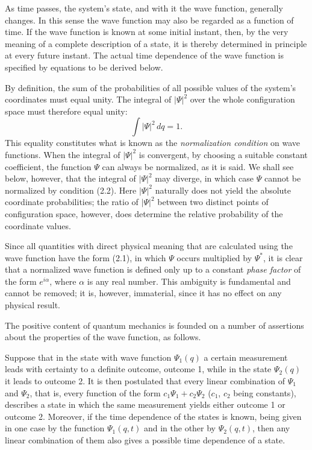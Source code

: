 As time passes, the system's state, and with it the wave function, generally
changes. In this sense the wave function may also be regarded as a function of
time. If the wave function is known at some initial instant, then, by the very
meaning of a complete description of a state, it is thereby determined in
principle at every future instant. The actual time dependence of the wave
function is specified by equations to be derived below.

By definition, the sum of the probabilities of all possible values of the
system's coordinates must equal unity. The integral of $|\Psi|^2$ over the
whole configuration space must therefore equal unity:
\begin{equation}
  \int |\Psi|^2\,dq=1.
  \tag{2.2}
\end{equation}
This equality constitutes what is known as the \textit{normalization condition}
on wave functions. When the integral of $|\Psi|^2$ is convergent, by choosing a
suitable constant coefficient, the function $\Psi$ can always be normalized,
as it is said. We shall see below, however, that the integral of $|\Psi|^2$
may diverge, in which case $\Psi$ cannot be normalized by condition (2.2).
Here $|\Psi|^2$ naturally does not yield the absolute coordinate
probabilities; the ratio of $|\Psi|^2$ between two distinct points of
configuration space, however, does determine the relative probability of
the coordinate values.

Since all quantities with direct physical meaning that are calculated using
the wave function have the form (2.1), in which $\Psi$ occurs multiplied by
$\Psi^*$, it is clear that a normalized wave function is defined only up to a
constant \textit{phase factor} of the form $e^{i\alpha}$, where $\alpha$ is
any real number. This ambiguity is fundamental and cannot be removed; it is,
however, immaterial, since it has no effect on any physical result.

The positive content of quantum mechanics is founded on a number of assertions
about the properties of the wave function, as follows.

Suppose that in the state with wave function $\Psi_1(q)$ a certain measurement
leads with certainty to a definite outcome, outcome 1, while in the state
$\Psi_2(q)$ it leads to outcome 2. It is then postulated that every linear
combination of $\Psi_1$ and $\Psi_2$, that is, every function of the form
$c_1\Psi_1+c_2\Psi_2$ ($c_1$, $c_2$ being constants), describes a state in
which the same measurement yields either outcome 1 or outcome 2. Moreover, if
the time dependence of the states is known, being given in one case by the
function $\Psi_1(q,t)$ and in the other by $\Psi_2(q,t)$, then any linear
combination of them also gives a possible time dependence of a state.

